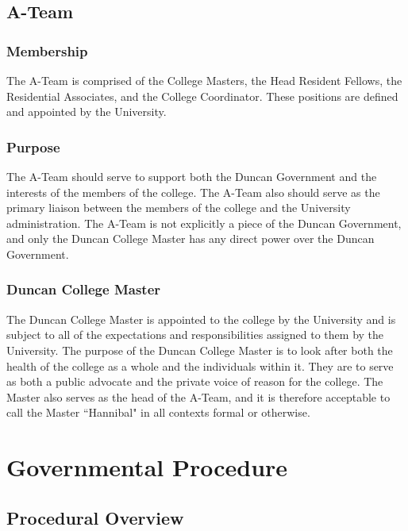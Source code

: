 \documentclass[USletter,12pt]{article}
\begin{document}
\begin{enumerate}[(a)]
\subsection{A-Team}

\subsubsection{Membership}
The A-Team is comprised of the College Masters, the Head Resident Fellows, the Residential Associates, and the College Coordinator.  These positions are defined and appointed by the University.

\subsubsection{Purpose}
The A-Team should serve to support  both the Duncan Government and the interests of the members of the college.  The A-Team also should serve as the primary liaison between the members of the college and the University administration.  The A-Team is not explicitly a piece of the Duncan Government, and only the Duncan College Master has any direct power over the Duncan Government.

\subsubsection{Duncan College Master}
The Duncan College Master is appointed to the college by the University and is subject to all of the expectations and responsibilities assigned to them by the University.  The purpose of the Duncan College Master is to look after both the health of the college as a whole and the individuals within it.  They are to serve as both a public advocate and the private voice of reason for the college.  The Master also serves as the head of the A-Team, and it is therefore acceptable to call the Master ``Hannibal" in all contexts formal or otherwise.

\section{Governmental Procedure}


\subsection{Procedural Overview}



\end{enumerate}
\end{document}
